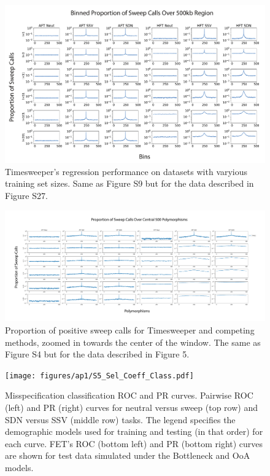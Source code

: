 \begin{figure}
    \centering
    \includegraphics[width=\textwidth]{figures/ap1/S3_Unzoomed_Spikes.pdf}
    \caption[Timesweeper’s regression performance on datasets with varyious training set sizes.]{Timesweeper’s regression performance on datasets with varyious training set sizes. Same as Figure S9 but for the data described in Figure S27.}
    \label{fig:S3_Unzoomed_Spikes}
\end{figure}

\begin{figure}
    \centering
    \includegraphics[width=\textwidth]{figures/ap1/S4_Zoomed_Spikes.pdf}
    \caption[Proportion of positive sweep calls for Timesweeper and competing methods, zoomed in towards the center of the window.]{Proportion of positive sweep calls for Timesweeper and competing methods, zoomed in towards the center of the window. The same as Figure S4 but for the data described in Figure 5. }
    \label{fig:S4_Zoomed_Spikes}
\end{figure}

\begin{figure}
    \centering
    \texttt{[image: figures/ap1/S5\_Sel\_Coeff\_Class.pdf]}
    \caption[Misspecification classification ROC and PR curves.]{Misspecification classification ROC and PR curves. Pairwise ROC (left) and PR (right) curves for neutral versus sweep (top row) and SDN versus SSV (middle row) tasks. The legend specifies the demographic models used for training and testing (in that order) for each curve. FET’s ROC (bottom left) and PR (bottom right) curves are shown for test data simulated under the Bottleneck and OoA models.}
    \label{fig:S5_Sel_Coeff_Class}
\end{figure}

